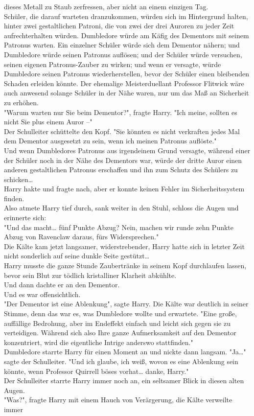 {dieses Metall zu Staub zerfressen, aber nicht an einem einzigen Tag.\\ Schüler, die darauf warteten dranzukommen, würden sich im Hintergrund halten, hinter zwei gestaltlichen Patroni, die von zwei der drei Auroren zu jeder Zeit aufrechterhalten würden. Dumbledore würde am Käfig des Dementors mit seinem Patronus warten. Ein einzelner Schüler würde sich dem Dementor nähern; und Dumbledore würde seinen Patronus auflösen; und der Schüler würde versuchen, seinen eigenen Patronus-Zauber zu wirken; und wenn er versagte, würde Dumbledore seinen Patronus wiederherstellen, bevor der Schüler einen bleibenden Schaden erleiden könnte. Der ehemalige Meisterduellant Professor Flitwick wäre auch anwesend solange Schüler in der Nähe waren, nur um das Maß an Sicherheit zu erhöhen.\\ "Warum warten nur Sie beim Dementor?", fragte Harry. "Ich meine, sollten es nicht Sie plus einem Auror --"\\ Der Schulleiter schüttelte den Kopf. "Sie könnten es nicht verkraften jedes Mal dem Dementor ausgesetzt zu sein, wenn ich meinen Patronus auflöste."\\ Und wenn Dumbledores Patronus aus irgendeinem Grund versagte, während einer der Schüler noch in der Nähe des Dementors war, würde der dritte Auror einen anderen gestaltlichen Patronus erschaffen und ihn zum Schutz des Schülers zu schicken…\\ Harry hakte und fragte nach, aber er konnte keinen Fehler im Sicherheitssystem finden.\\ Also atmete Harry tief durch, sank weiter in den Stuhl, schloss die Augen und erinnerte sich:\\ "Und das macht… fünf Punkte Abzug? Nein, machen wir runde zehn Punkte Abzug von Ravenclaw daraus, fürs Widersprechen."\\ Die Kälte kam jetzt langsamer, widerstrebender, Harry hatte sich in letzter Zeit nicht sonderlich auf seine dunkle Seite gestützt…\\ Harry musste die ganze Stunde Zaubertränke in seinem Kopf durchlaufen lassen, bevor sein Blut zur tödlich kristalliner Klarheit abkühlte.\\ Und dann dachte er an den Dementor.\\ Und es war offensichtlich.\\ "Der Dementor ist eine Ablenkung", sagte Harry. Die Kälte war deutlich in seiner Stimme, denn das war es, was Dumbledore wollte und erwartete. "Eine große, auffällige Bedrohung, aber im Endeffekt einfach und leicht sich gegen sie zu verteidigen. Während sich also Ihre ganze Aufmerksamkeit auf den Dementor konzentriert, wird die eigentliche Intrige anderswo stattfinden."\\ Dumbledore starrte Harry für einen Moment an und nickte dann langsam. "Ja…" sagte der Schulleiter. "Und ich glaube, ich weiß, wovon es eine Ablenkung sein könnte, wenn Professor Quirrell böses vorhat… danke, Harry."\\ Der Schulleiter starrte Harry immer noch an, ein seltsamer Blick in diesen alten Augen.\\ "Was?", fragte Harry mit einem Hauch von Verärgerung, die Kälte verweilte immer }
